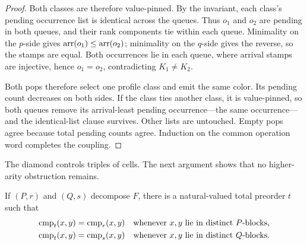 \begin{proof}
Both classes are therefore value-pinned.  By the invariant, each class's
pending occurrence list is identical across the queues.  Thus \(o_1\) and
\(o_2\) are pending in both queues, and their rank components tie within each
queue.  Minimality on the \(p\)-side gives
\(\operatorname{arr}(o_1)\le\operatorname{arr}(o_2)\); minimality on the \(q\)-side gives the reverse, so
the stamps are equal.  Both occurrences lie in each queue, where arrival
stamps are injective, hence \(o_1=o_2\), contradicting \(K_1\ne K_2\).

Both pops therefore select one profile class and emit the same color.  Its
pending count decreases on both sides.  If the class ties another class, it is
value-pinned, so both queues remove its arrival-least pending occurrence---the
same occurrence---and the identical-list clause survives.  Other lists are
untouched.  Empty pops agree because total pending counts agree.  Induction on
the common operation word completes the coupling.
\end{proof}



The diamond controls triples of cells.  The next argument shows that no
higher-arity obstruction remains.

\begin{lemma}
\label{lem:meet-preorder}
If \((P,r)\) and \((Q,s)\) decompose \(F\), there is a natural-valued total
preorder \(t\) such that
\begin{equation}
 \begin{aligned}
  \operatorname{cmp}_t(x,y)&=\operatorname{cmp}_r(x,y)
    &&\text{whenever \(x,y\) lie in distinct \(P\)-blocks},\\
  \operatorname{cmp}_t(x,y)&=\operatorname{cmp}_s(x,y)
    &&\text{whenever \(x,y\) lie in distinct \(Q\)-blocks}.
 \end{aligned}
 \label{eq:meet-compatibility}
\end{equation}
\end{lemma}

